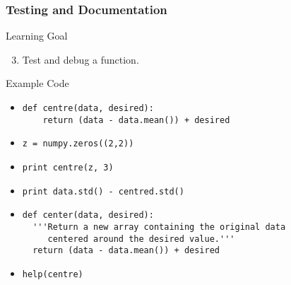 \documentclass{beamer}
\begin{document}
\begin{frame}[fragile]
\frametitle{Testing and Documentation}
\begin{block}{Learning Goal}
\begin{enumerate}
\setcounter{enumi}{2}
\item    Test and debug a function.
\end{enumerate}
\end{block}
\begin{block}{Example Code}
\small{
\begin{itemize}
\item
\begin{verbatim}
def centre(data, desired):
    return (data - data.mean()) + desired
\end{verbatim}
\item 
\begin{verbatim}
z = numpy.zeros((2,2))
\end{verbatim}
\item 
\begin{verbatim}
print centre(z, 3)
\end{verbatim}
\item 
\begin{verbatim}
print data.std() - centred.std()
\end{verbatim}
\item 
\begin{verbatim}
def center(data, desired):
  '''Return a new array containing the original data 
     centered around the desired value.'''
  return (data - data.mean()) + desired
\end{verbatim}
\item 
\begin{verbatim}
help(centre)
\end{verbatim}
\end{itemize}}
\end{block}
\end{frame}
\end{document}
